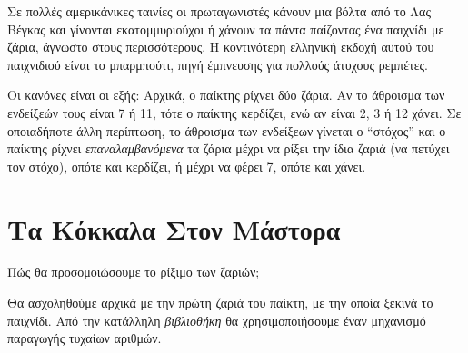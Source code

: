 \documentclass[a4paper,11pt,oneside]{book}
\begin{document}

Σε πολλές αμερικάνικες ταινίες οι πρωταγωνιστές κάνουν μια βόλτα από το Λας Βέγκας και γίνονται εκατομμυριούχοι ή χάνουν τα πάντα παίζοντας ένα παιχνίδι με ζάρια, άγνωστο στους περισσότερους. Η κοντινότερη ελληνική εκδοχή αυτού του παιχνιδιού είναι το μπαρμπούτι, πηγή έμπνευσης για πολλούς άτυχους ρεμπέτες.

Οι κανόνες είναι οι εξής: Αρχικά, ο παίκτης ρίχνει δύο ζάρια. Αν το άθροισμα των ενδείξεών τους είναι 7 ή 11, τότε ο παίκτης κερδίζει, ενώ αν είναι 2, 3 ή 12 χάνει. Σε οποιαδήποτε άλλη περίπτωση, το άθροισμα των ενδείξεων γίνεται ο ``στόχος'' και ο παίκτης ρίχνει \emph{επαναλαμβανόμενα} τα ζάρια μέχρι να ρίξει την ίδια ζαριά (να πετύχει τον στόχο), οπότε και κερδίζει, ή μέχρι να φέρει 7, οπότε και χάνει.


\section{Τα Κόκκαλα Στον Μάστορα}

\begin{question}
Πώς θα προσομοιώσουμε το ρίξιμο των ζαριών;
\end{question}

Θα ασχοληθούμε αρχικά με την πρώτη ζαριά του παίκτη, με την οποία ξεκινά το παιχνίδι. Από την κατάλληλη \emph{βιβλιοθήκη} %
θα χρησιμοποιήσουμε έναν μηχανισμό παραγωγής τυχαίων αριθμών.

\end{document}
